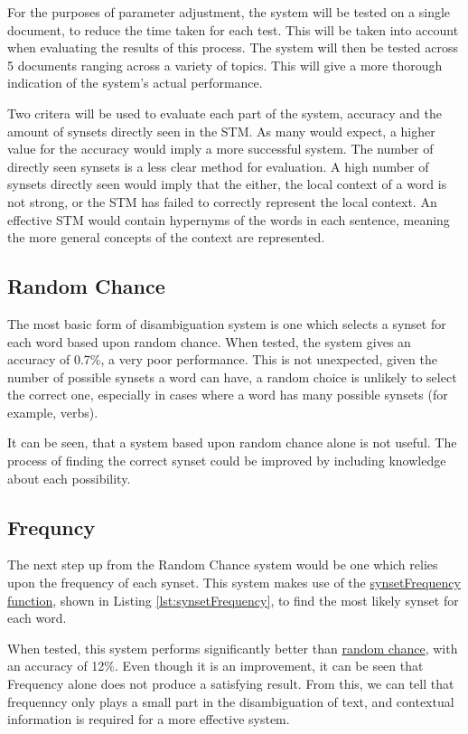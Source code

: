 \documentclass[]{article}
\begin{document}
For the purposes of parameter adjustment, the system will be tested on a single document, to reduce the time taken for each test. This will be taken into account when evaluating the results of this process. The system will then be tested across 5 documents ranging across a variety of topics. This will give a more thorough indication of the system's actual performance. 

Two critera will be used to evaluate each part of the system, accuracy and the amount of synsets directly seen in the STM. As many would expect, a higher value for the accuracy would imply a more successful system. The number of directly seen synsets is a less clear method for evaluation. A high number of synsets directly seen would imply that the either, the local context of a word is not strong, or the STM has failed to correctly represent the local context. An effective STM would contain hypernyms of the words in each sentence, meaning the more general concepts of the context are represented.

\subsection{Random Chance}
\label{sec:EvRandomChance}
The most basic form of disambiguation system is one which selects a synset for each word based upon random chance. When tested, the system gives an accuracy of 0.7\%, a very poor performance. This is not unexpected, given the number of possible synsets a word can have, a random choice is unlikely to select the correct one, especially in cases where a word has many possible synsets (for example, verbs).

It can  be seen, that a system based upon random chance alone is not useful. The process of finding the correct synset could be improved by including knowledge about each possibility.

\subsection{Frequncy}
\label{sec:EvFrequency}
The next step up from the Random Chance system would be one which relies upon the frequency of each synset. This system makes use of the \hyperref[lst:synsetFrequency]{synsetFrequency function}, shown in Listing \ref{lst:synsetFrequency}, to find the most likely synset for each word.

When tested, this system performs significantly better than \hyperref[sec:EvFrequency]{random chance}, with an accuracy of 12\%. Even though it is an improvement, it can be seen that Frequency alone does not produce a satisfying result. From this, we can tell that frequenncy only plays a small part in the disambiguation of text, and contextual information is required for a more effective system.
\end{document}
